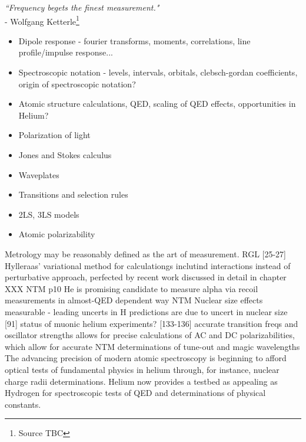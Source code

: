 \begin{adjustwidth}{4cm}{0cm}
\begin{flushright}
\emph{``Frequency begets the finest measurement."\\} 
- Wolfgang Ketterle\footnote{Source TBC}
\end{flushright}
\end{adjustwidth}





\begin{itemize}
	\item Dipole response - fourier transforms, moments, correlations, line profile/impulse response...
	\item Spectroscopic notation - levels, intervals, orbitals, clebsch-gordan coefficients, origin of spectroscopic notation?
	\item Atomic structure calculations, QED, scaling of QED effects, opportunities in Helium?
	\item Polarization of light
	\item Jones and Stokes calculus
	\item Waveplates
	\item Transitions and selection rules
	\item 2LS, 3LS models
	\item Atomic polarizability
\end{itemize}
Metrology may be reasonably defined as the art of measurement.
RGL [25-27] Hylleraas' variational method for calculationgs inclutind interactions instead of perturbative approach, perfected by recent work discussed in detail in chapter XXX
NTM p10 He is promising candidate to measure alpha via recoil measurements in almost-QED dependent way 
NTM Nuclear size effects measurable - leading uncerts in H predictions are due to uncert in nuclear size [91] 
		status of muonic helium experiments?
[133-136] accurate transition freqs and oscillator strengths allows for precise calculations of AC and DC polarizabilities, which allow for accurate NTM determinations of tune-out and magic wavelengths 
The advancing precision of modern atomic spectroscopy is beginning to afford optical tests of fundamental physics in helium through, for instance, nuclear charge radii determinations. Helium now provides a testbed as appealing as Hydrogen for spectroscopic tests of QED and determinations of physical constants. 
